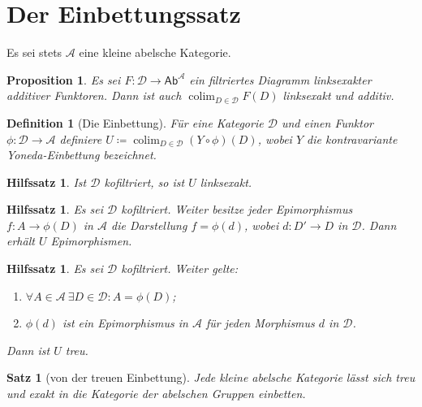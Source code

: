 \documentclass[a4paper, parskip=half]{scrartcl}
\theoremstyle{marginbreak}
\newtheorem{proposition}[remark]{Proposition}
\newtheorem{theorem}[remark]{Satz}
\newtheorem{lemma}[remark]{Hilfssatz}
\newtheorem{definition}[remark]{Definition}
\newcommand\ccat\mathsf
\newcommand\cat\mathcal
\DeclareMathOperator{\colim}{colim}
\begin{document}
	\section{Der Einbettungssatz}
		Es sei stets $\cat{A}$ eine kleine abelsche Kategorie.
		\begin{proposition}
			Es sei $F\colon\cat{D}\to\ccat{Ab}^{\cat{A}}$ ein filtriertes Diagramm
			linksexakter additiver Funktoren. Dann ist auch $\colim_{D\in\cat{D}} F(D)$
			linksexakt und additiv.
		\end{proposition}
		\begin{definition}[Die Einbettung]
			Für eine Kategorie $\cat{D}$ und einen Funktor $\phi\colon\cat{D}\to\cat{A}$
			definiere $U\coloneqq\colim_{D\in\cat{D}} (Y\circ\phi)(D)$, wobei $Y$ die
			kontravariante Yoneda-Einbettung bezeichnet.
		\end{definition}
		\begin{lemma}
			Ist $\cat{D}$ kofiltriert, so ist $U$ linksexakt.
		\end{lemma}
		\begin{lemma}
			Es sei $\cat{D}$ kofiltriert. Weiter besitze jeder Epimorphismus
			$f\colon A\to\phi(D)$ in $\cat{A}$ die Darstellung $f = \phi(d)$, wobei
			$d\colon D'\to D$ in $\cat{D}$. Dann erhält $U$ Epimorphismen.
		\end{lemma}
		\begin{lemma}
			Es sei $\cat{D}$ kofiltriert. Weiter gelte:
			\begin{enumerate}[label=(\arabic*)]
				\item $\forall A\in\cat{A}\ \exists D\in\cat{D}: A=\phi(D)$;
				\item $\phi(d)$ ist ein Epimorphismus in $\cat{A}$ für jeden Morphismus $d$ in $\cat{D}$.
			\end{enumerate}
			Dann ist $U$ treu.
		\end{lemma}
		\begin{theorem}[von der treuen Einbettung]\label{abeb}
			Jede kleine abelsche Kategorie lässt sich treu und exakt in die Kategorie
			der abelschen Gruppen einbetten.
		\end{theorem}
\end{document}
